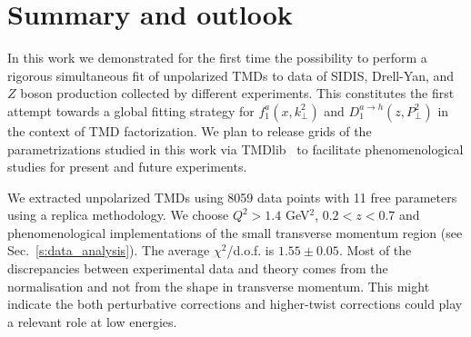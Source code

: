 \documentclass[aps,preprintnumbers,showpacs,nofootinbib,superscriptaddress,floatfix]{revtex4}
\begin{document}





\section{Summary and outlook}
\label{s:conclusions}


In this work we demonstrated for the first time the possibility to perform a rigorous simultaneous fit of unpolarized TMDs to data of SIDIS, Drell-Yan, and $Z$ boson production collected by different experiments.
This constitutes the first attempt towards a global fitting strategy for $f_1^a(x,k_\perp^2)$ and $D_1^{a \to h}(z,P_\perp^2)$ in the context of TMD factorization. 
We plan to release grids of the parametrizations studied in this work via TMDlib~\cite{Hautmann:2014kza} to facilitate phenomenological studies for present and future experiments.

We extracted unpolarized TMDs using 8059 data points with 11 free parameters using a replica methodology. We choose $Q^2 > 1.4$ GeV$^2$, $0.2 < z < 0.7$ and phenomenological implementations of the small transverse momentum region (see Sec.~\ref{s:data_analysis}). The average $\chi^2$/d.o.f. is $1.55 \pm 0.05$.
Most of the discrepancies between experimental data and theory comes from the normalisation and not from the shape in transverse momentum. This might indicate the both perturbative corrections and higher-twist corrections could play a relevant role at low energies.
\end{document}
